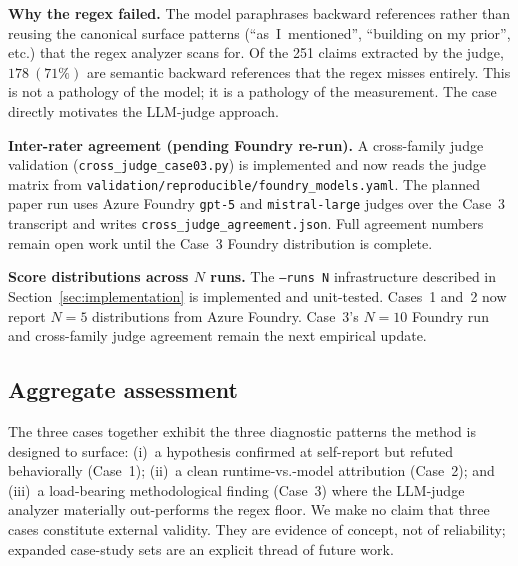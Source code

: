 \textbf{Why the regex failed.} The model paraphrases backward
references rather than reusing the canonical surface patterns
(``as~I~mentioned'', ``building on my prior'', etc.) that the regex
analyzer scans for. Of the 251 claims extracted by the judge,
$178~(71\%)$ are semantic backward references that the regex misses
entirely. This is not a pathology of the model; it is a pathology of
the measurement. The case directly motivates the LLM-judge approach.

\textbf{Inter-rater agreement (pending Foundry re-run).} A
cross-family judge validation (\texttt{cross\_judge\_case03.py}) is
implemented and now reads the judge matrix from
\texttt{validation/reproducible/foundry\_models.yaml}. The planned
paper run uses Azure Foundry \texttt{gpt-5} and \texttt{mistral-large}
judges over the Case~3 transcript and writes
\texttt{cross\_judge\_agreement.json}. Full agreement numbers remain
open work until the Case~3 Foundry distribution is complete.

\textbf{Score distributions across $N$ runs.} The \texttt{--runs N}
infrastructure described in Section~\ref{sec:implementation} is
implemented and unit-tested. Cases~1 and~2 now report $N=5$
distributions from Azure Foundry. Case~3's $N=10$ Foundry run and
cross-family judge agreement remain the next empirical update.

\subsection{Aggregate assessment}

The three cases together exhibit the three diagnostic patterns the
method is designed to surface: (i)~a hypothesis confirmed at
self-report but refuted behaviorally (Case~1); (ii)~a clean
runtime-vs.-model attribution (Case~2); and (iii)~a load-bearing
methodological finding (Case~3) where the LLM-judge analyzer
materially out-performs the regex floor. We make no claim that three
cases constitute external validity. They are evidence of concept, not
of reliability; expanded case-study sets are an explicit thread of
future work.
